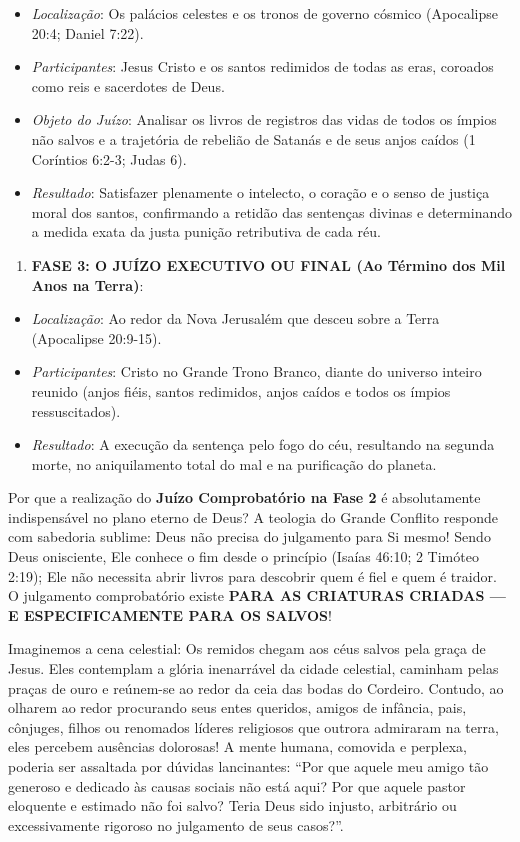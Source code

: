 \documentclass[11pt,a4paper,openany]{book}
\begin{document}
\begin{itemize}
  \item \textit{Localização}: Os palácios celestes e os tronos de governo cósmico (Apocalipse 20:4; Daniel 7:22).
  \item \textit{Participantes}: Jesus Cristo e os santos redimidos de todas as eras, coroados como reis e sacerdotes de Deus.
  \item \textit{Objeto do Juízo}: Analisar os livros de registros das vidas de todos os ímpios não salvos e a trajetória de rebelião de Satanás e de seus anjos caídos (1 Coríntios 6:2-3; Judas 6).
  \item \textit{Resultado}: Satisfazer plenamente o intelecto, o coração e o senso de justiça moral dos santos, confirmando a retidão das sentenças divinas e determinando a medida exata da justa punição retributiva de cada réu.
\end{itemize}


\begin{enumerate}
  \item \textbf{FASE 3: O JUÍZO EXECUTIVO OU FINAL (Ao Término dos Mil Anos na Terra)}:
\end{enumerate}

\begin{itemize}
  \item \textit{Localização}: Ao redor da Nova Jerusalém que desceu sobre a Terra (Apocalipse 20:9-15).
  \item \textit{Participantes}: Cristo no Grande Trono Branco, diante do universo inteiro reunido (anjos fiéis, santos redimidos, anjos caídos e todos os ímpios ressuscitados).
  \item \textit{Resultado}: A execução da sentença pelo fogo do céu, resultando na segunda morte, no aniquilamento total do mal e na purificação do planeta.
\end{itemize}


Por que a realização do \textbf{Juízo Comprobatório na Fase 2} é absolutamente indispensável no plano eterno de Deus?
A teologia do Grande Conflito responde com sabedoria sublime: Deus não precisa do julgamento para Si mesmo! Sendo Deus onisciente, Ele conhece o fim desde o princípio (Isaías 46:10; 2 Timóteo 2:19); Ele não necessita abrir livros para descobrir quem é fiel e quem é traidor.
O julgamento comprobatório existe \textbf{PARA AS CRIATURAS CRIADAS — E ESPECIFICAMENTE PARA OS SALVOS}!

Imaginemos a cena celestial: Os remidos chegam aos céus salvos pela graça de Jesus. Eles contemplam a glória inenarrável da cidade celestial, caminham pelas praças de ouro e reúnem-se ao redor da ceia das bodas do Cordeiro. Contudo, ao olharem ao redor procurando seus entes queridos, amigos de infância, pais, cônjuges, filhos ou renomados líderes religiosos que outrora admiraram na terra, eles percebem ausências dolorosas!
A mente humana, comovida e perplexa, poderia ser assaltada por dúvidas lancinantes: ``Por que aquele meu amigo tão generoso e dedicado às causas sociais não está aqui? Por que aquele pastor eloquente e estimado não foi salvo? Teria Deus sido injusto, arbitrário ou excessivamente rigoroso no julgamento de seus casos?''.
\end{document}
